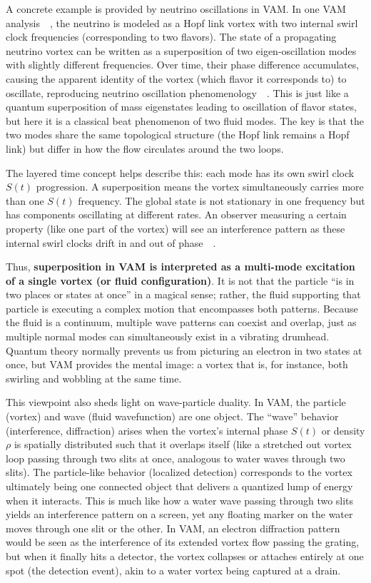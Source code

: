 \documentclass[a4paper,12pt]{article}
\begin{document}
    A concrete example is provided by neutrino oscillations in VAM. In one VAM analysis~\cite{reference_96}~\cite{reference_97}, the neutrino is modeled as a Hopf link vortex with two internal swirl clock frequencies (corresponding to two flavors). The state of a propagating neutrino vortex can be written as a superposition of two eigen-oscillation modes with slightly different frequencies. Over time, their phase difference accumulates, causing the apparent identity of the vortex (which flavor it corresponds to) to oscillate, reproducing neutrino oscillation phenomenology~\cite{reference_98}~\cite{reference_99}. This is just like a quantum superposition of mass eigenstates leading to oscillation of flavor states, but here it is a classical beat phenomenon of two fluid modes. The key is that the two modes share the same topological structure (the Hopf link remains a Hopf link) but differ in how the flow circulates around the two loops.

    The layered time concept helps describe this: each mode has its own swirl clock $S(t)$ progression. A superposition means the vortex simultaneously carries more than one $S(t)$ frequency. The global state is not stationary in one frequency but has components oscillating at different rates. An observer measuring a certain property (like one part of the vortex) will see an interference pattern as these internal swirl clocks drift in and out of phase~\cite{reference_100}~\cite{reference_101}.

    Thus, \textbf{superposition in VAM is interpreted as a multi-mode excitation of a single vortex (or fluid configuration)}. It is not that the particle “is in two places or states at once” in a magical sense; rather, the fluid supporting that particle is executing a complex motion that encompasses both patterns. Because the fluid is a continuum, multiple wave patterns can coexist and overlap, just as multiple normal modes can simultaneously exist in a vibrating drumhead. Quantum theory normally prevents us from picturing an electron in two states at once, but VAM provides the mental image: a vortex that is, for instance, both swirling and wobbling at the same time.

    This viewpoint also sheds light on wave-particle duality. In VAM, the particle (vortex) and wave (fluid wavefunction) are one object. The “wave” behavior (interference, diffraction) arises when the vortex’s internal phase $S(t)$ or density $\rho$ is spatially distributed such that it overlaps itself (like a stretched out vortex loop passing through two slits at once, analogous to water waves through two slits). The particle-like behavior (localized detection) corresponds to the vortex ultimately being one connected object that delivers a quantized lump of energy when it interacts. This is much like how a water wave passing through two slits yields an interference pattern on a screen, yet any floating marker on the water moves through one slit or the other. In VAM, an electron diffraction pattern would be seen as the interference of its extended vortex flow passing the grating, but when it finally hits a detector, the vortex collapses or attaches entirely at one spot (the detection event), akin to a water vortex being captured at a drain.
\end{document}
